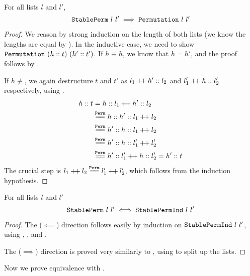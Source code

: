 \documentclass[11pt]{thesis}
\begin{document}
\begin{theorem}
  For all lists $l$ and $l'$,
  \begin{equation*}
    \texttt{StablePerm}~l~l' \implies \texttt{Permutation}~l~l'
  \end{equation*}
\end{theorem}
\begin{proof}
  We reason by strong induction on the length of both lists (we know
  the lengths are equal by ). In the inductive
  case, we need to show $\texttt{Permutation}~(h :: t)~(h' :: t')$. If $h
  \equiv h$, we know that $h = h'$, and the proof follows by
  .

  If $h \not\equiv$, we again destructure $t$ and $t'$ as $l_1 \mathbin{+\mkern-3mu+} h' ::
  l_2$ and $l_1' \mathbin{+\mkern-3mu+} h :: l_2'$ respectively, using
  .
  \begin{align*}
    h::t &= h :: l_1 \dplus h' :: l_2 \\
    &\eqperm h :: h' :: l_1 \dplus l_2 \\
    &\eqperm h' :: h :: l_1 \dplus l_2 \\
    &\eqperm h' :: h :: l_1' \dplus l_2' \\
    &\eqperm h' :: l_1' \dplus h :: l_2' = h'::t
  \end{align*}
  The crucial step is $l_1 \dplus l_2 \eqperm l_1' \dplus l_2'$, which
  follows from the induction hypothesis.
\end{proof}

\begin{theorem}
  For all lists $l$ and $l'$
  \begin{equation*}
    \texttt{StablePerm}~l~l' \iff \texttt{StablePermInd}~l~l'
  \end{equation*}
\end{theorem}
\begin{proof}
  The ($\impliedby$) direction follows easily by induction on
  $\texttt{StablePermInd}~l~l'$, using ,
  , and .

  The ($\implies$) direction is proved very similarly to
  , using  to split up
  the lists.
\end{proof}

Now we prove equivalence with .
\end{document}

